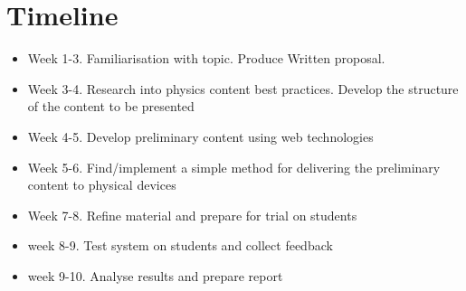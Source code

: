 \documentclass[12pt,a4paper]{article}  %
\begin{document}
\section*{Timeline}

\begin{itemize}
\item Week 1-3. Familiarisation with topic. Produce Written proposal.  
\item Week 3-4. Research into physics content best
  practices.  Develop the structure of the content to be presented
\item Week 4-5. Develop preliminary content using web technologies
\item Week 5-6. Find/implement a simple method for delivering the
  preliminary content to physical devices 
\item Week 7-8. Refine material and prepare for trial on students 
\item week 8-9. Test system on students and collect feedback 
\item week 9-10. Analyse results and prepare report
\end{itemize}



\end{document}
